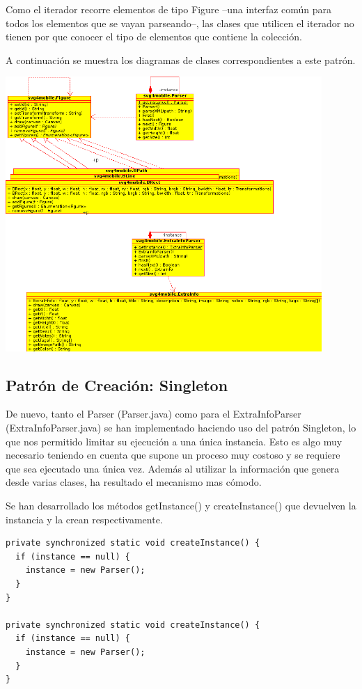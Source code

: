 \documentclass[a4paper,10pt]{article}
\begin{document}
Como el iterador recorre elementos de tipo Figure --una interfaz común para todos los elementos que se vayan parseando--, las clases que utilicen el iterador no tienen por que conocer el tipo de elementos que contiene la colección.

A continuación se muestra los diagramas de clases correspondientes a este patrón.

\begin{center}
 \includegraphics[width=12cm]{iterator.png}
\end{center}


\subsection{Patrón de Creación: Singleton}

De nuevo, tanto el Parser (Parser.java) como para el ExtraInfoParser (ExtraInfoParser.java) se han implementado haciendo uso del patrón Singleton, lo que nos permitido limitar su ejecución a una única instancia. Esto es algo muy necesario teniendo en cuenta que supone un proceso muy costoso y se requiere que sea ejecutado una única vez. Además al utilizar la información que genera desde varias clases, ha resultado el mecanismo mas cómodo.

Se han desarrollado los métodos getInstance() y createInstance() que devuelven la instancia y la crean respectivamente.

\begin{verbatim}
private synchronized static void createInstance() {
  if (instance == null) {
    instance = new Parser();
  }
}

private synchronized static void createInstance() {
  if (instance == null) {
    instance = new Parser();
  }
}
\end{verbatim} 
\end{document}
